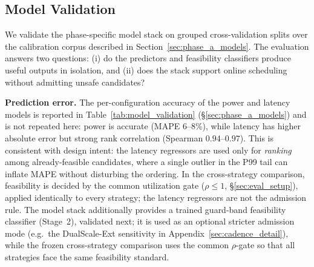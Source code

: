 \subsection{Model Validation}
\label{sec:eval_models}

\iffalse  %
We validate the phase-specific model stack on grouped cross-validation splits over the calibration corpus described in Section~\ref{sec:phase_a_models}. The evaluation answers two questions: (i) do the predictors and feasibility classifiers produce useful outputs in isolation, and (ii) does the stack support online scheduling without admitting unsafe candidates?

\textbf{Prediction error.} The per-configuration accuracy of the power and latency models is reported in Table~\ref{tab:model_validation} (\S\ref{sec:phase_a_models}) and is not repeated here: power is accurate (MAPE $6$--$8\%$), while latency has higher absolute error but strong rank correlation (Spearman $0.94$--$0.97$). This is consistent with design intent: the latency regressors are used only for \emph{ranking} among already-feasible candidates, where a single outlier in the P99 tail can inflate MAPE without disturbing the ordering.
In the cross-strategy comparison, feasibility is decided by the common utilization gate ($\rho \le 1$, \S\ref{sec:eval_setup}), applied identically to every strategy; the latency regressors are not the admission rule.
The model stack additionally provides a trained guard-band feasibility classifier (Stage~2), validated next; it is used as an optional stricter admission mode (e.g.\ the DualScale-Ext sensitivity in Appendix~\ref{sec:cadence_detail}), while the frozen cross-strategy comparison uses the common $\rho$-gate so that all strategies face the same feasibility standard.

